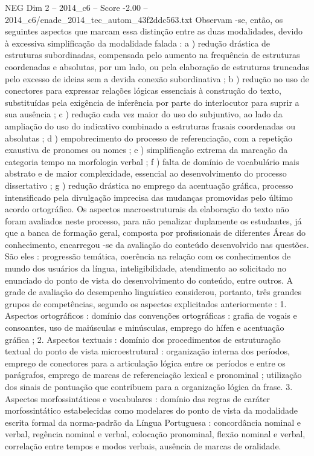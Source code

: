 \begin{textsample}{NEG Dim 2 – 2014\_c6 – Score -2.00 – 2014\_c6/enade\_2014\_tec\_autom\_43f2ddc563.txt}
Observam -se, então, os seguintes aspectos que marcam essa distinção entre as duas modalidades, devido à excessiva simplificação da modalidade falada : a ) redução drástica de estruturas subordinadas, compensada pelo aumento na frequência de estruturas coordenadas e absolutas, por um lado, ou pela elaboração de estruturas truncadas pelo excesso de ideias sem a devida conexão subordinativa ; b ) redução no uso de conectores para expressar relações lógicas essenciais à construção do texto, substituídas pela exigência de inferência por parte do interlocutor para suprir a sua ausência ; c ) redução cada vez maior do uso do subjuntivo, ao lado da ampliação do uso do indicativo combinado a estruturas frasais coordenadas ou absolutas ; d ) empobrecimento do processo de referenciação, com a repetição exaustiva de pronomes ou nomes ; e ) simplificação extrema da marcação da categoria tempo na morfologia verbal ; f ) falta de domínio de vocabulário mais abstrato e de maior complexidade, essencial ao desenvolvimento do processo dissertativo ; g ) redução drástica no emprego da acentuação gráfica, processo intensificado pela divulgação imprecisa das mudanças promovidas pelo último acordo ortográfico.
Os aspectos macroestruturais da elaboração do texto não foram avaliados neste processo, para não penalizar duplamente os estudantes, já que a banca de formação geral, composta por profissionais de diferentes Áreas do conhecimento, encarregou -se da avaliação do conteúdo desenvolvido nas questões.
São eles : progressão temática, coerência na relação com os conhecimentos de mundo dos usuários da língua, inteligibilidade, atendimento ao solicitado no enunciado do ponto de vista do desenvolvimento do conteúdo, entre outros.
A grade de avaliação do desempenho linguístico considerou, portanto, três grandes grupos de competências, segundo os aspectos explicitados anteriormente : 1.
Aspectos ortográficos : domínio das convenções ortográficas : grafia de vogais e consoantes, uso de maiúsculas e minúsculas, emprego do hífen e acentuação gráfica ; 2.
Aspectos textuais : domínio dos procedimentos de estruturação textual do ponto de vista microestrutural : organização interna dos períodos, emprego de conectores para a articulação lógica entre os períodos e entre os parágrafos, emprego de marcas de referenciação lexical e pronominal ; utilização dos sinais de pontuação que contribuem para a organização lógica da frase. 3.
Aspectos morfossintáticos e vocabulares : domínio das regras de caráter morfossintático estabelecidas como modelares do ponto de vista da modalidade escrita formal da norma-padrão da Língua Portuguesa : concordância nominal e verbal, regência nominal e verbal, colocação pronominal, flexão nominal e verbal, correlação entre tempos e modos verbais, ausência de marcas de oralidade.

\end{textsample}

